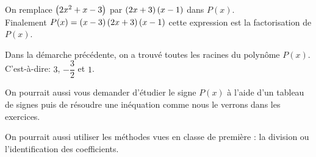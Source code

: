 On remplace $ \left(2x^{2}+x-3\right) $  par $ \left(2x+3\right)\left(x-1\right) $ dans $  P(x) $.\\
Finalement \; $ P(x)=\left(x-3\right)\left(2x+3\right)\left(x-1\right) $\; cette expression est la factorisation de $ P(x) $.

\bigskip

\begin{remark}
 Dans la démarche précédente, on a trouvé  toutes les racines du polynôme $ P(x) $.  C'est-à-dire:\; $ 3$,  $ -\dfrac{3}{2} $ et $1 $.
 
On pourrait aussi vous demander  d'étudier le signe  $ P(x) $ à l'aide d'un tableau de signes puis de résoudre une inéquation comme nous le verrons dans les exercices.
\end{remark}

\begin{remark}

 On pourrait aussi utiliser les méthodes vues en classe de première : la division ou l'identification des coefficients.
\end{remark}
 

